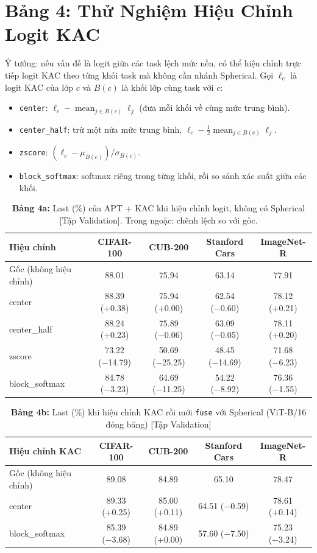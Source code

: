 \documentclass[10pt,a4paper]{article}
\begin{document}
\section{Bảng 4: Thử Nghiệm Hiệu Chỉnh Logit KAC}
Ý tưởng: nếu vấn đề là logit giữa các task lệch mức nền, có thể hiệu chỉnh trực tiếp logit KAC theo từng khối task mà không cần nhánh Spherical. Gọi $\ell_c$ là logit KAC của lớp $c$ và $B(c)$ là khối lớp cùng task với $c$:
\begin{itemize}
  \item \texttt{center}: $\ell_c - \operatorname{mean}_{j\in B(c)} \ell_j$ (đưa mỗi khối về cùng mức trung bình).
  \item \texttt{center\_half}: trừ một nửa mức trung bình, $\ell_c - \tfrac12\operatorname{mean}_{j\in B(c)} \ell_j$.
  \item \texttt{zscore}: $(\ell_c - \mu_{B(c)})/\sigma_{B(c)}$.
  \item \texttt{block\_softmax}: softmax riêng trong từng khối, rồi so sánh xác suất giữa các khối.
\end{itemize}

\begin{table}[h]
\centering\small
\caption{\textbf{Bảng 4a:} Last (\%) của APT + KAC khi hiệu chỉnh logit, không có Spherical [Tập Validation]. Trong ngoặc: chênh lệch so với gốc.}
\begin{tabular}{lcccc}
\toprule
Hiệu chỉnh & CIFAR-100 & CUB-200 & Stanford Cars & ImageNet-R \\
\midrule
Gốc (không hiệu chỉnh) & 88.01 & 75.94 & 63.14 & 77.91 \\
center & 88.39 (+0.38) & 75.94 (+0.00) & 62.54 (−0.60) & 78.12 (+0.21) \\
center\_half & 88.24 (+0.23) & 75.89 (−0.06) & 63.09 (−0.05) & 78.11 (+0.20) \\
zscore & 73.22 (−14.79) & 50.69 (−25.25) & 48.45 (−14.69) & 71.68 (−6.23) \\
block\_softmax & 84.78 (−3.23) & 64.69 (−11.25) & 54.22 (−8.92) & 76.36 (−1.55) \\
\bottomrule
\end{tabular}
\end{table}

\begin{table}[h]
\centering\small
\caption{\textbf{Bảng 4b:} Last (\%) khi hiệu chỉnh KAC rồi mới \texttt{fuse} với Spherical (ViT-B/16 đóng băng) [Tập Validation]}
\begin{tabular}{lcccc}
\toprule
Hiệu chỉnh KAC & CIFAR-100 & CUB-200 & Stanford Cars & ImageNet-R \\
\midrule
Gốc (không hiệu chỉnh) & 89.08 & 84.89 & 65.10 & 78.47 \\
center & 89.33 (+0.25) & 85.00 (+0.11) & 64.51 (−0.59) & 78.61 (+0.14) \\
block\_softmax & 85.39 (−3.68) & 84.89 (+0.00) & 57.60 (−7.50) & 75.23 (−3.24) \\
\bottomrule
\end{tabular}
\end{table}
\end{document}
